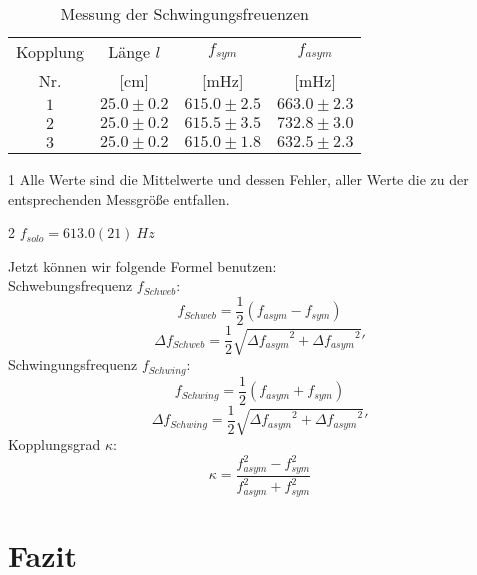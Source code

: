 \documentclass[a4paper,10pt]{article}
\begin{document}
\unboldmath
\begin{table}[htb]
\centering
\caption{Messung der Schwingungsfreuenzen}\label{tab:Tab1}
\begin{threeparttable}
\begin{tabular}{cccc}
\toprule
Kopplung &Länge \(l\) &\(f_{sym}\) &\(f_{asym}\)\\
Nr. &[cm] &[mHz] &[mHz]\\
\midrule
\(1\)&\(25.0\pm0.2\)&\(615.0\pm2.5\)&\(663.0\pm2.3\)\\
\(2\)&\(25.0\pm0.2\)&\(615.5\pm3.5\)&\(732.8\pm3.0\)\\
\(3\)&\(25.0\pm0.2\)&\(615.0\pm1.8\)&\(632.5\pm2.3\)\\
  \bottomrule
 \end{tabular}
\begin{tablenotes}
\raggedright
\item[1] Alle Werte sind die Mittelwerte und dessen Fehler, aller Werte die zu der entsprechenden Messgröße entfallen.
\item[2] \(f_{solo}=613.0(21)\: Hz\)
\end{tablenotes}
\end{threeparttable}\end{table}
Jetzt können wir folgende Formel benutzen:\\
Schwebungsfrequenz \(f_{Schweb}\):
\begin{equation} 
	f_{Schweb}=\frac{1}{2}{\left(f_{asym}-f_{sym}\right)}
\end{equation} 
\begin{equation} 
	\Delta f_{Schweb}=\frac{1}{2}\sqrt{{\Delta f_{asym}}^2+{\Delta f_{asym}}^2}'
\end{equation} 
Schwingungsfrequenz \(f_{Schwing}\):
\begin{equation} 
	f_{Schwing}=\frac{1}{2}{\left(f_{asym}+f_{sym}\right)}
\end{equation} 
\begin{equation} 
	\Delta f_{Schwing}=\frac{1}{2}\sqrt{{\Delta f_{asym}}^2+{\Delta f_{asym}}^2}'
\end{equation} 
Kopplungsgrad \(\kappa\):
\begin{equation} 
	\kappa=\frac{{f^2_{asym}}-{f^2_{sym}}}{{f^2_{asym}}+{f^2_{sym}}}
\end{equation} 



\section{Fazit}

\unboldmath
\end{document}
